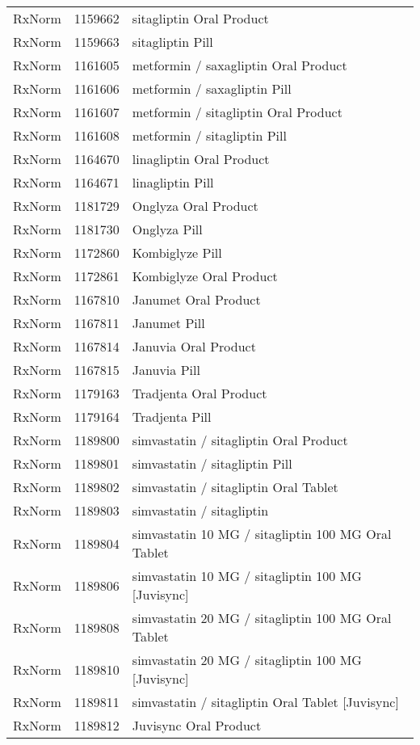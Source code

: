 \begin{longtable}{p{}p{}p{}}
  RxNorm & 1159662 & sitagliptin Oral Product \\ 
  RxNorm & 1159663 & sitagliptin Pill \\ 
  RxNorm & 1161605 & metformin / saxagliptin Oral Product \\ 
  RxNorm & 1161606 & metformin / saxagliptin Pill \\ 
  RxNorm & 1161607 & metformin / sitagliptin Oral Product \\ 
  RxNorm & 1161608 & metformin / sitagliptin Pill \\ 
  RxNorm & 1164670 & linagliptin Oral Product \\ 
  RxNorm & 1164671 & linagliptin Pill \\ 
  RxNorm & 1181729 & Onglyza Oral Product \\ 
  RxNorm & 1181730 & Onglyza Pill \\ 
  RxNorm & 1172860 & Kombiglyze Pill \\ 
  RxNorm & 1172861 & Kombiglyze Oral Product \\ 
  RxNorm & 1167810 & Janumet Oral Product \\ 
  RxNorm & 1167811 & Janumet Pill \\ 
  RxNorm & 1167814 & Januvia Oral Product \\ 
  RxNorm & 1167815 & Januvia Pill \\ 
  RxNorm & 1179163 & Tradjenta Oral Product \\ 
  RxNorm & 1179164 & Tradjenta Pill \\ 
  RxNorm & 1189800 & simvastatin / sitagliptin Oral Product \\ 
  RxNorm & 1189801 & simvastatin / sitagliptin Pill \\ 
  RxNorm & 1189802 & simvastatin / sitagliptin Oral Tablet \\ 
  RxNorm & 1189803 & simvastatin / sitagliptin \\ 
  RxNorm & 1189804 & simvastatin 10 MG / sitagliptin 100 MG Oral Tablet \\ 
  RxNorm & 1189806 & simvastatin 10 MG / sitagliptin 100 MG [Juvisync] \\ 
  RxNorm & 1189808 & simvastatin 20 MG / sitagliptin 100 MG Oral Tablet \\ 
  RxNorm & 1189810 & simvastatin 20 MG / sitagliptin 100 MG [Juvisync] \\ 
  RxNorm & 1189811 & simvastatin / sitagliptin Oral Tablet [Juvisync] \\ 
  RxNorm & 1189812 & Juvisync Oral Product \\ 

\end{longtable}

